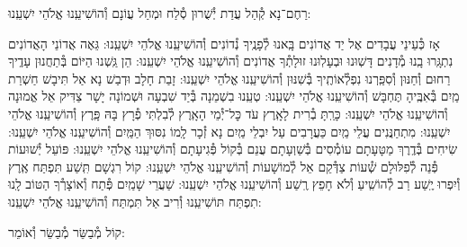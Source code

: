 \documentclass[twoside, openany, parskip=half, 11pt]{book}
\begin{document}
\shatzvkahal
רַחֶם־נָא קְ֯הַל עֲדַת יְ֯שֻׁרוּן סְ֯לַח וּמְחַל עֲוֹנָם וְ֯הוֹשִׁיעֵֽנוּ אֱלֹהֵי יִשְׁעֵֽנוּ:

\begin{small}
אָז כְּ֯עֵינֵי עֲבָדִים אֶל יַד אֲדוֹנִים בָּֽאנוּ לְ֯פָנֶֽיךָ נְ֯דוֹנִים וְ֯הוֹשִׁיעֵֽנוּ אֱלֹהֵי יִשְׁעֵֽנוּ:
גֵּאֶה אֲדוֹנֵי הָאֲדוֹנִים נִתְגָּֽרוּ בָֽנוּ מְ֯דָנִים דָּשֽׁוּנוּ וּבְעָלֽוּנוּ זוּלָתְ֯ךָ אֲדוֹנִים וְ֯הוֹשִׁיעֵֽנוּ אֱלֹהֵי יִשְׁעֵֽנוּ:
הֵן גַּֽשְׁנוּ הַיּוֹם בְּ֯תַחֲנוּן עָדֶֽיךָ רַחוּם וְ֯חַנּוּן וְ֯סִפַּֽרְנוּ נִפְלְ֯אוֹתֶֽיךָ בְּ֯שִׁנּוּן וְ֯הוֹשִׁיעֵֽנוּ אֱלֹהֵי יִשְׁעֵֽנוּ:
זָבַת חָלָב וּדְבַשׁ נָא אַל תִּיבָשׁ חַשְׁרַת מַֽיִם בְּ֯אִבֶּֽיהָ תֶּחְבָּשׁ וְ֯הוֹשִׁיעֵֽנוּ אֱלֹהֵי יִשְׁעֵֽנוּ:
טְעֵֽנוּ בִשְׁמֵנָה בְּ֯יַד שִׁבְעָה וּשְׁמוֹנָה יָשָׁר צַדִּיק אֵל אֱמוּנָה וְ֯הוֹשִׁיעֵֽנוּ אֱלֹהֵי יִשְׁעֵֽנוּ:
כָּרַֽתָּ בְ֯רִית לָאָֽרֶץ עֹד כׇּל־יְ֯מֵי הָאָֽרֶץ לְ֯בִלְתִּי פְ֯רָץ בָּהּ פָּֽרֶץ וְ֯הוֹשִׁיעֵֽנוּ אֱלֹהֵי יִשְׁעֵֽנוּ:
מִתְחַנֲּנִים עֲלֵי מַֽיִם כַּעֲרָבִים עַל יִבְלֵי מַֽיִם נָא זְ֯כָר לָֽמוֹ נִסּוּךְ הַמַּֽיִם וְ֯הוֹשִׁיעֵֽנוּ אֱלֹהֵי יִשְׁעֵֽנוּ:
שִׂיחִים בְּ֯דֶֽרֶךְ מַטָּעָתָם עוֹמְ֯סִים בְּ֯שַׁוְעָתָם עֲנֵם בְּ֯קוֹל פְּ֯גִיעָתָם וְ֯הוֹשִׁיעֵֽנוּ אֱלֹהֵי יִשְׁעֵֽנוּ:
פּוֹעֵל יְ֯שׁוּעוֹת פְּ֯נֵה לְ֯פִלּוּלָם שְׁ֯עוֹת צַדְּ֯קֵם אֵל לְ֯מוֹשָׁעוֹת וְ֯הוֹשִׁיעֵֽנוּ אֱלֹהֵי יִשְׁעֵֽנוּ:
קוֹל רִגְשָׁם תִּֽשַׁע תִּפְתַּח אֶֽרֶץ וְ֯יִפְרוּ יֶֽשַׁע רַב לְ֯הוֹשִֽׁיעַ וְ֯לֹא חָפֵץ רֶֽשַׁע וְ֯הוֹשִׁיעֵֽנוּ אֱלֹהֵי יִשְׁעֵֽנוּ:
שַׁעֲרֵי שָׁמַֽיִם פְּ֯תַח וְ֯אוֹצָרְ֯ךָ הַטּוֹב לָֽנוּ תִפְתַּח תּוֹשִׁיעֵֽנוּ וְ֯רִיב אַל תִּמְתַּח וְ֯הוֹשִׁיעֵֽנוּ אֱלֹהֵי יִשְׁעֵֽנוּ:

\end{small}

\begin{large}
קוֹל מְ֯בַשֵּׂר מְ֯בַשֵּׂר וְ֯אוֹמֵר:

\end{large}
\end{document}
